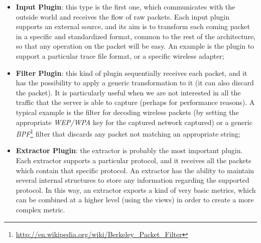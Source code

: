 \documentclass[12pt,a4paper,cucitura]{toptesi}
\begin{document}
\begin{itemize}
\item \textbf{Input Plugin}: this type is the first one, which communicates with the outside world and receives the flow of raw packets. Each input plugin supports an external source, and its aim is to transform each coming packet in a specific and standardized format, common to the rest of the architecture, so that any operation on the packet will be easy.
An example is the plugin to support a particular trace file format, or a specific wireless adapter;
\item \textbf{Filter Plugin}: this kind of plugin sequentially receives each packet, and it has the possibility to apply a generic transformation to it (it can also discard the packet). It is particularly useful when we are not interested in all the traffic that the server is able to capture (perhaps for performance reasons). A typical example is the filter for decoding wireless packets (by setting the appropriate \emph{WEP/WPA} key for the captured network captured) or a generic \emph{BPF}\footnote{\url{http://en.wikipedia.org/wiki/Berkeley_Packet_Filter}} filter that discards any packet not matching an appropriate string;
\item \textbf{Extractor Plugin}: the extractor is probably the most important plugin. Each extractor supports a particular protocol, and it receives all the packets which contain that specific protocol. An extractor has the ability to maintain several internal structures to store any information regarding the supported protocol. In this way, an extractor exports a kind of very basic metrics, which can be combined at a higher level (using the views) in order to create a more complex metric.


\end{itemize}
\end{document}
